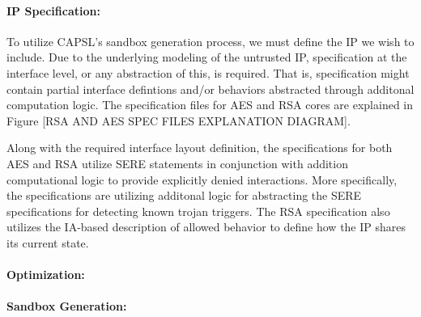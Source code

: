 \documentclass[sigconf]{acmart}
\theoremstyle{plain}
\theoremstyle{remark}
\begin{document}
\paragraph{IP Specification:}

To utilize CAPSL's sandbox generation process, we must define the IP we wish to include. Due to the underlying modeling of the untrusted IP, specification at the interface level, or any abstraction of this, is required. That is, specification might contain partial interface defintions and/or behaviors abstracted through additonal computation logic. The specification files for AES and RSA cores are explained in Figure [RSA AND AES SPEC FILES EXPLANATION DIAGRAM].

Along with the required interface layout definition, the specifications for both AES and RSA utilize SERE statements in conjunction with addition computational logic to provide explicitly denied interactions. More specifically, the specifications are utilizing additonal logic for abstracting the SERE specifications for detecting known trojan triggers. The RSA specification also utilizes the IA-based description of allowed behavior to define how the IP shares its current state.


\paragraph{Optimization:}

\paragraph{Sandbox Generation:}
\end{document}
